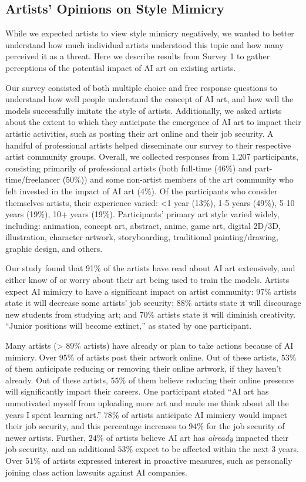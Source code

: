 \secspace
\subsection{Artists' Opinions on Style Mimicry}
\label{sec:user-study}

While we expected artists to view style mimicry negatively, we wanted to
better understand how much individual artists understood this topic and how
many perceived it as a threat. Here we describe results from Survey 1 to
gather perceptions of the potential impact of AI art on existing artists.

 Our survey consisted of both multiple choice and free
response questions to understand how well people understand the concept of AI
art, and how well the models successfully imitate the style of artists.
Additionally, we asked artists about the extent to which they anticipate the
emergence of AI art to impact their artistic activities, such as posting
their art online and their job security.  A handful of professional artists
helped disseminate our survey to their respective artist community groups.
Overall, we collected responses from 1,207 participants, consisting primarily
of professional artists (both full-time (46\%) and part-time/freelancer
(50\%)) and some non-artist members of the art community who felt invested in
the impact of AI art (4\%). Of the participants who consider themselves
artists, their experience varied: <1 year (13\%), 1-5 years (49\%), 5-10
years (19\%), 10+ years (19\%).  Participants' primary art style varied
widely, including: animation, concept art, abstract, anime, game art, digital
2D/3D, illustration, character artwork, storyboarding, traditional
painting/drawing, graphic design, and others.

 Our study found that 91\% of the artists have read about
AI art extensively, and either know of or worry about their art being used to
train the models. Artists expect AI mimicry to have a significant impact on artist
community: $97\%$ artists state it will decrease some artists' job security;
$88\%$ artists state it will discourage new students from studying art; and
$70\%$ artists state it will diminish creativity. ``Junior positions will
become extinct,'' as stated by one participant.

Many artists (> 89\% artists) have already or plan to take actions because of
AI mimicry. Over $95\%$ of artists post their artwork online. Out of these
artists, $53\%$ of them anticipate reducing or removing their online artwork,
if they haven't already. Out of these artists, $55\%$ of them believe
reducing their online presence will significantly impact their careers. One
participant stated ``AI art has unmotivated myself from uploading more art
and made me think about all the years I spent learning art.'' $78\%$ of
artists anticipate AI mimicry would impact their job security, and this
percentage increases to $94\%$ for the job security of newer
artists. Further, $24\%$ of artists believe AI art has \textit{already}
impacted their job security, and an additional $53\%$ expect to be affected
within the next 3 years. Over $51\%$ of artists expressed interest in
proactive measures, such as personally joining class action lawsuits against
AI companies.  

